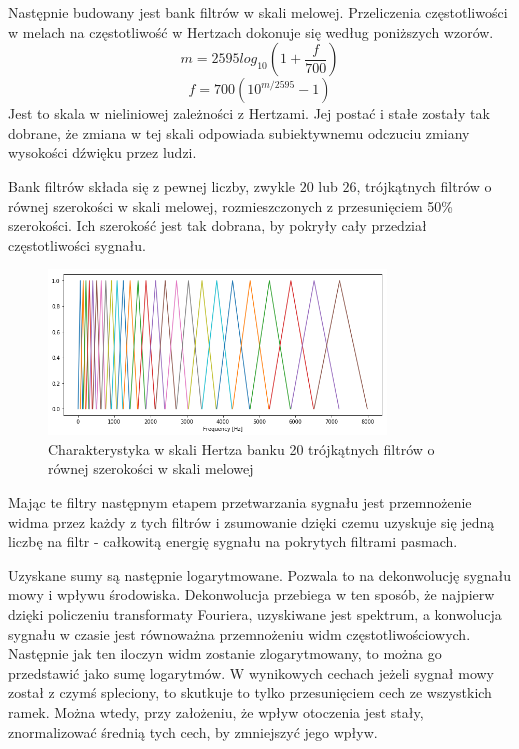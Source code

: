 Następnie budowany jest bank filtrów w skali melowej. Przeliczenia częstotliwości w melach na
częstotliwość w Hertzach dokonuje się według poniższych wzorów.
$$m = 2595 log_{10}(1 + \frac{f}{700})$$
$$f = 700 (10^{m/2595} - 1)$$
Jest to skala w nieliniowej zależności z Hertzami. Jej postać i stałe zostały tak dobrane,
że zmiana w tej skali odpowiada subiektywnemu odczuciu zmiany wysokości dźwięku przez ludzi.

Bank filtrów składa się z pewnej liczby, zwykle $20$ lub $26$, trójkątnych filtrów o równej
szerokości w skali melowej, rozmieszczonych z przesunięciem 50\% szerokości. Ich szerokość
jest tak dobrana, by pokryły cały przedział częstotliwości sygnału.

\begin{figure}[H]
    \centering
    \includegraphics[width=0.8\textwidth]{images/2_1_d_mel_filters}
    \caption{Charakterystyka w skali Hertza banku 20 trójkątnych filtrów o równej szerokości w skali melowej}
    \label{fig:2_1_d_mel_filters}
\end{figure}

Mając te filtry następnym etapem przetwarzania sygnału jest przemnożenie widma przez każdy z tych filtrów i zsumowanie
dzięki czemu uzyskuje się jedną liczbę na filtr - całkowitą energię sygnału na pokrytych filtrami pasmach.

Uzyskane sumy są następnie logarytmowane. Pozwala to na dekonwolucję sygnału mowy i wpływu środowiska.
Dekonwolucja przebiega w ten sposób, że najpierw dzięki policzeniu transformaty Fouriera,
uzyskiwane jest spektrum, a konwolucja sygnału w czasie jest równoważna przemnożeniu widm częstotliwościowych.
Następnie jak ten iloczyn widm zostanie zlogarytmowany, to można go przedstawić jako sumę logarytmów.
W wynikowych cechach jeżeli sygnał mowy został z czymś spleciony, to skutkuje to tylko przesunięciem cech
ze wszystkich ramek. Można wtedy, przy założeniu, że wpływ otoczenia jest stały, znormalizować średnią tych cech,
by zmniejszyć jego wpływ.

